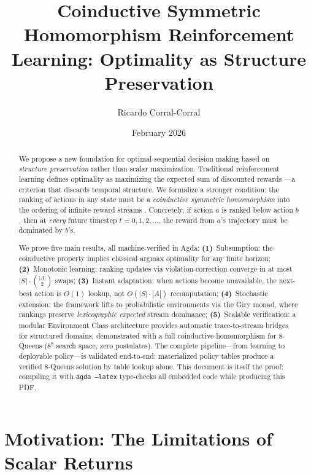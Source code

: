 \documentclass[9pt,a4paper]{article}
\title{\textbf{Coinductive Symmetric Homomorphism Reinforcement Learning: Optimality as Structure Preservation}}
\author{Ricardo Corral-Corral}
\date{February 2026}
\theoremstyle{plain}
\theoremstyle{definition}
\theoremstyle{remark}
\begin{document}
\maketitle

\begin{abstract}
We propose a new foundation for optimal sequential decision making based on \emph{structure preservation} rather than scalar maximization. Traditional reinforcement learning defines optimality as maximizing the expected sum of discounted rewards \cite{Sutton2018}---a criterion that discards temporal structure. We formalize a stronger condition: the ranking of actions in any state must be a \emph{coinductive symmetric homomorphism} into the ordering of infinite reward streams \cite{Rutten2000}. Concretely, if action $a$ is ranked below action $b$, then at \emph{every} future timestep $t = 0, 1, 2, \ldots$, the reward from $a$'s trajectory must be dominated by $b$'s.

We prove five main results, all machine-verified in Agda:
\textbf{(1)}~Subsumption: the coinductive property implies classical argmax optimality for any finite horizon;
\textbf{(2)}~Monotonic learning: ranking updates via violation-correction converge in at most $|S| \cdot \binom{|A|}{2}$ swaps;
\textbf{(3)}~Instant adaptation: when actions become unavailable, the next-best action is $O(1)$ lookup, not $O(|S| \cdot |A|)$ recomputation;
\textbf{(4)}~Stochastic extension: the framework lifts to probabilistic environments via the Giry monad, where rankings preserve \emph{lexicographic expected} stream dominance;
\textbf{(5)}~Scalable verification: a modular Environment Class architecture provides automatic trace-to-stream bridges for structured domains, demonstrated with a full coinductive homomorphism for $8$-Queens ($8^8$ search space, zero postulates).
The complete pipeline---from learning to deployable policy---is validated end-to-end: materialized policy tables produce a verified $8$-Queens solution by table lookup alone.
This document is itself the proof: compiling it with \texttt{agda --latex} type-checks all embedded code while producing this PDF.
\end{abstract}


\section{Motivation: The Limitations of Scalar Returns}
\end{document}
